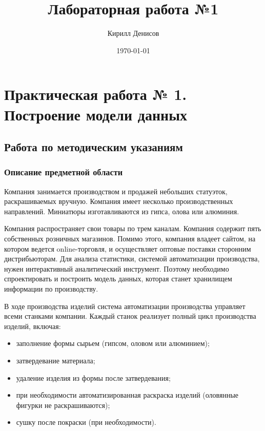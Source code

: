 \documentclass[a4paper,14pt]{extarticle}
\author{Кирилл Денисов}
\title{Лабораторная работа №1}
\date{\today}
\newcommand{\pathToCommonFolder}{/home/denilai/Documents/repos/latex/Common}
\newcommand{\methodsection}{Работа по методическим указаниям}
\begin{document}
	
	\gdef\capnames{
		\gdef\figurename{Рисунок}
		\gdef\chaptername{ГЛАВА}
		\gdef\appendixname{ПРИЛОЖЕНИЕ}
		\gdef\bibname{СПИСОК ЛИТЕРАТУРЫ}
		\gdef\contentsname{СОДЕРЖАНИЕ}
		
	}
	
	
	\thispagestyle{empty}
	
	\newpage
	\tableofcontents
	\newpage

\normalsize

\section{Практическая работа № 1. \\Построение модели данных}
\subsection{\methodsection}
\subsubsection*{Описание предметной области}
Компания занимается производством и продажей небольших статуэток,
раскрашиваемых вручную. Компания имеет несколько производственных
направлений. Миниатюры изготавливаются из гипса, олова или алюминия.

Компания распространяет свои товары по трем каналам. Компания содержит
пять собственных розничных магазинов. Помимо этого, компания владеет
сайтом, на котором ведется online-торговля, и осуществляет оптовые поставки
сторонним
дистрибьюторам.
Для
анализа
статистики,
системой автоматизации производства, нужен интерактивный аналитический
инструмент. Поэтому необходимо спроектировать и построить модель данных,
которая станет хранилищем информации по производству.

В ходе производства изделий система автоматизации производства
управляет всеми станками компании. Каждый станок реализует полный цикл
производства изделий, включая:
\begin{itemize}
	\item заполнение формы сырьем (гипсом, оловом или алюминием);
	\item затвердевание материала;
	\item  удаление изделия из формы после затвердевания;
	\item при необходимости автоматизированная раскраска изделий (оловянные фигурки не раскрашиваются);
	\item сушку после покраски (при необходимости).
\end{itemize}
\end{document}
